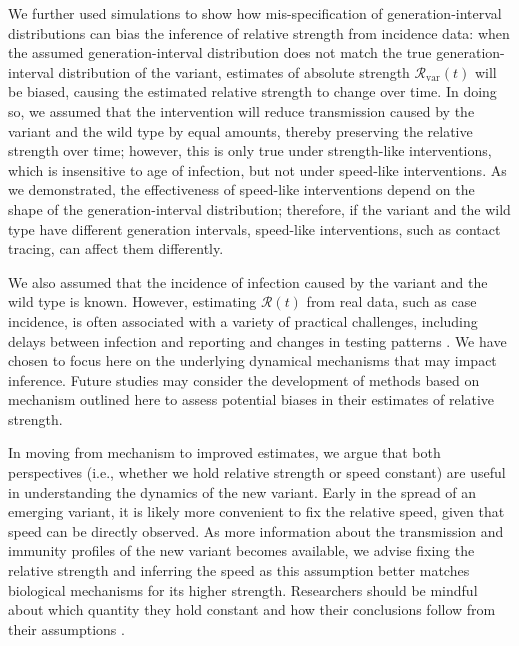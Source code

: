 \documentclass[12pt]{article}
\newcommand{\vvvar}{\mathrm{var}}
\newcommand{\Rx}[1]{\ensuremath{{\mathcal R}_{#1}}\xspace}
\newcommand{\RR}{\ensuremath{{\mathcal R}}\xspace}
\newcommand{\Rv}{\Rx{\vvvar}}
\begin{document}
We further used simulations to show how mis-specification of generation-interval distributions can bias the inference of relative strength from incidence data:
when the assumed generation-interval distribution does not match the true generation-interval distribution of the variant, estimates of absolute strength $\Rv(t)$ will be biased, causing the estimated relative strength to change over time.
In doing so, we assumed that the intervention will reduce transmission caused by the variant and the wild type by equal amounts, thereby preserving the relative strength over time;
however, this is only true under strength-like interventions, which is insensitive to age of infection, but not under speed-like interventions. 
As we demonstrated, the effectiveness of speed-like interventions depend on the shape of the generation-interval distribution;
therefore, if the variant and the wild type have different generation intervals, speed-like interventions, such as contact tracing, can affect them differently.

We also assumed that the incidence of infection caused by the variant and the wild type is known.
However, estimating $\RR(t)$ from real data, such as case incidence, is often associated with a variety of practical challenges, including delays between infection and reporting and changes in testing patterns \citep{gostic2020practical}.
We have chosen to focus here on the underlying dynamical mechanisms that may impact inference.
Future studies may consider the development of methods based on mechanism outlined here to assess potential biases in their estimates of relative strength. 

In moving from mechanism to improved estimates, we argue that both perspectives (i.e., whether we hold relative strength or speed constant) are useful in understanding the dynamics of the new variant.
Early in the spread of an emerging variant, it is likely more convenient to fix the relative speed, given that speed can be directly observed.
As more information about the transmission and immunity profiles of the new variant becomes available, we advise fixing the relative strength and inferring the speed as this assumption better matches biological mechanisms for its higher strength.
Researchers should be mindful about which quantity they hold constant and how their conclusions follow from their assumptions \citep{doi:10.1098/rspb.2020.1556}.
\end{document}
